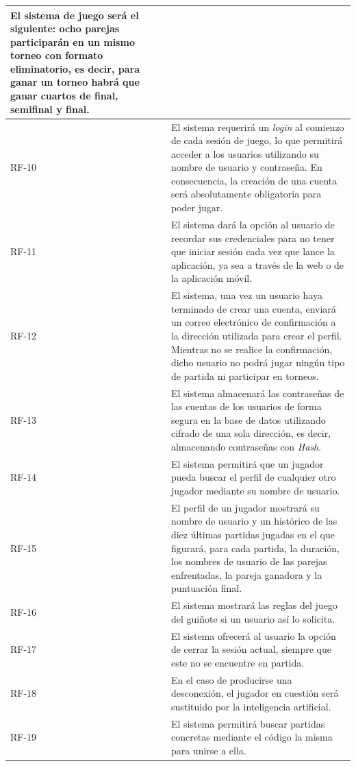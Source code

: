 \documentclass{article}
\begin{document}
\begin{center}
\begin{longtable}{ | p{} | p{} | }
        El sistema de juego será el siguiente: ocho parejas participarán en un mismo torneo con formato eliminatorio, es decir, para ganar un torneo habrá que ganar cuartos de final, semifinal y final. \\
        \hline
        RF-10 & El sistema requerirá un \textit{login} al comienzo de cada sesión de juego, lo que permitirá acceder a los usuarios utilizando su nombre de usuario y contraseña. En consecuencia, la creación de una cuenta será absolutamente obligatoria para poder jugar. \\
        \hline
        RF-11 & El sistema dará la opción al usuario de recordar sus credenciales para no tener que iniciar sesión cada vez que lance la aplicación, ya sea a través de la web o de la aplicación móvil. \\
        \hline
        RF-12 & El sistema, una vez un usuario haya terminado de crear una cuenta, enviará un correo electrónico de confirmación a la dirección utilizada para crear el perfil. Mientras no se realice la confirmación, dicho usuario no podrá jugar ningún tipo de partida ni participar en torneos. \\
        \hline
        RF-13 & El sistema almacenará las contraseñas de las cuentas de los usuarios de forma segura en la base de datos utilizando cifrado de una sola dirección, es decir, almacenando contraseñas con \textit{Hash}. \\
        \hline
        RF-14 & El sistema permitirá que un jugador pueda buscar el perfil de cualquier otro jugador mediante su nombre de usuario. \\
        \hline
        RF-15 & El perfil de un jugador mostrará su nombre de usuario y un histórico de las diez últimas partidas jugadas en el que figurará, para cada partida, la duración, los nombres de usuario de las parejas enfrentadas, la pareja ganadora y la puntuación final. \\
        \hline
        RF-16 & El sistema mostrará las reglas del juego del guiñote si un usuario así lo solicita. \\
        \hline
        RF-17 & El sistema ofrecerá al usuario la opción de cerrar la sesión actual, siempre que este no se encuentre en partida. \\
        \hline
        RF-18 & En el caso de producirse una desconexión, el jugador en cuestión será sustituido por la inteligencia artificial. \\
        \hline
        RF-19 & El sistema permitirá buscar partidas concretas mediante el código la misma para unirse a ella. \\

\end{longtable}
\end{center}
\end{document}

